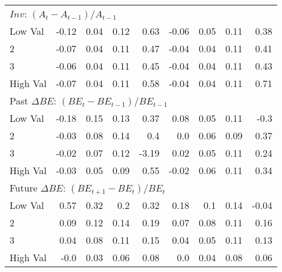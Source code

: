 \begin{tabular}{lrrrrrrrr}
    \multicolumn{9}{l}{$Inv$: $(A_t - A_{t-1}) / A_{t-1}$} \\
    Low Val    & -0.12  & 0.04  & 0.12  & 0.63  & -0.06  & 0.05  & 0.11  & 0.38  \\
           2   & -0.07  & 0.04  & 0.11  & 0.47  & -0.04  & 0.04  & 0.11  & 0.41  \\
           3   & -0.06  & 0.04  & 0.11  & 0.45  & -0.04  & 0.04  & 0.11  & 0.43  \\
    High Val   & -0.07  & 0.04  & 0.11  & 0.58  & -0.04  & 0.04  & 0.11  & 0.71  \\
    [1em]
  

    \multicolumn{9}{l}{Past $\Delta BE$: $(BE_t - BE_{t-1}) / BE_{t-1}$} \\
    Low Val    & -0.18  & 0.15  & 0.13  & 0.37  & 0.08  & 0.05  & 0.11  & -0.3  \\
           2   & -0.03  & 0.08  & 0.14  & 0.4  & 0.0  & 0.06  & 0.09  & 0.37  \\
           3   & -0.02  & 0.07  & 0.12  & -3.19  & 0.02  & 0.05  & 0.11  & 0.24  \\
    High Val   & -0.03  & 0.05  & 0.09  & 0.55  & -0.02  & 0.06  & 0.11  & 0.34  \\
    [1em]
  

    \multicolumn{9}{l}{Future $\Delta BE$: $(BE_{t+1} - BE_t) / BE_t$} \\
    Low Val    & 0.57  & 0.32  & 0.2  & 0.32  & 0.18  & 0.1  & 0.14  & -0.04  \\
           2   & 0.09  & 0.12  & 0.14  & 0.19  & 0.07  & 0.08  & 0.11  & 0.16  \\
           3   & 0.04  & 0.08  & 0.11  & 0.15  & 0.04  & 0.05  & 0.11  & 0.13  \\
    High Val   & -0.0  & 0.03  & 0.06  & 0.08  & 0.0  & 0.04  & 0.08  & 0.06  \\
    [1em]
  

  \bottomrule
\end{tabular}